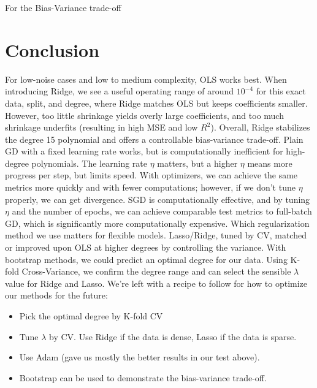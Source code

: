 \documentclass[amssymb,twocolumn,aps]{revtex4-2}
\begin{document}
For the Bias-Variance trade-off 





\section{Conclusion}\label{section:conclusion} 

For low-noise cases and low to medium complexity, OLS works best. When introducing Ridge, we see a useful operating range of around $10^{-4}$ for this exact data, split, and degree, where Ridge matches OLS but keeps coefficients smaller. However, too little shrinkage yields overly large coefficients, and too much shrinkage underfits (resulting in high MSE and low $R^2$). Overall, Ridge stabilizes the degree 15 polynomial and offers a controllable bias-variance trade-off. Plain GD with a fixed learning rate works, but is computationally inefficient for high-degree polynomials. The learning rate $\eta$ matters, but a higher $\eta$ means more progress per step, but limits speed. With optimizers, we can achieve the same metrics more quickly and with fewer computations; however, if we don't tune $\eta$ properly, we can get divergence. 
SGD is computationally effective, and by tuning $\eta$ and the number of epochs, we can achieve comparable test metrics to full-batch GD, which is significantly more computationally expensive. Which regularization method we use matters for flexible models. Lasso/Ridge, tuned by CV, matched or improved upon OLS at higher degrees by controlling the variance. With bootstrap methods, we could predict an optimal degree for our data. Using K-fold Cross-Variance, we confirm the degree range and can select the sensible $\lambda$ value for Ridge and Lasso. We're left with a recipe to follow for how to optimize our methods for the future: 

\begin{itemize}
    \item Pick the optimal degree by K-fold CV
    \item Tune $\lambda$ by CV. Use Ridge if the data is dense, Lasso if the data is sparse. 
    \item Use Adam (gave us mostly the better results in our test above). 
    \item Bootstrap can be used to demonstrate the bias-variance trade-off. 
\end{itemize}



\end{document}
